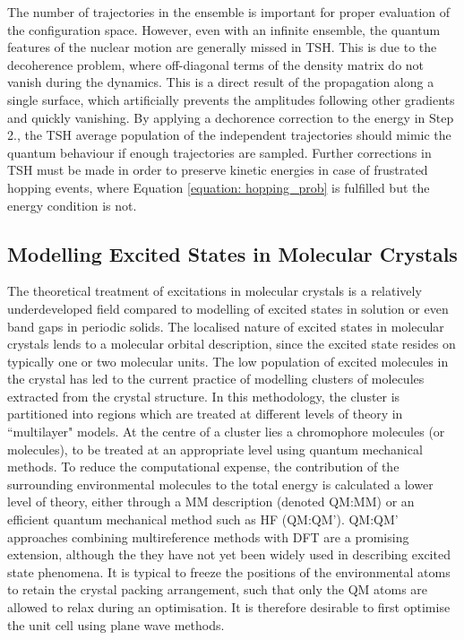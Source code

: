The number of trajectories in the ensemble is important for proper evaluation of the configuration space. However, even with an infinite ensemble, the quantum features of the nuclear motion are generally missed in \ac{TSH}. This is due to the decoherence problem, where off-diagonal terms of the density matrix do not vanish during the dynamics. This is a direct result of the propagation along a single surface, which artificially prevents the amplitudes following other gradients and quickly vanishing.\cite{Crespo-Otero2018} By applying a dechorence correction to the energy in Step 2., the \ac{TSH} average population of the independent trajectories should mimic the quantum behaviour if enough trajectories are sampled.\cite{Granucci2007} Further corrections in \ac{TSH} must be made in order to preserve kinetic energies in case of frustrated hopping events, where Equation \ref{equation: hopping_prob} is fulfilled but the energy condition is not.

\subsection{Modelling Excited States in Molecular Crystals} \label{section: excited_states_crystals}
The theoretical treatment of excitations in molecular crystals is a relatively underdeveloped field compared to modelling of excited states in solution or even band gaps in periodic solids. The localised nature of excited states in molecular crystals lends to a molecular orbital description, since the excited state resides on typically one or two molecular units.\cite{Sauer1989} The low population of excited molecules in the crystal has led to the current practice of modelling clusters of molecules extracted from the crystal structure. In this methodology, the cluster is partitioned into regions which are treated at different levels of theory in ``multilayer" models. At the centre of a cluster lies a chromophore molecules (or molecules), to be treated at an appropriate level using quantum mechanical methods. To reduce the computational expense, the contribution of the surrounding environmental molecules to the total energy is calculated a lower level of theory, either through a \acf{MM} description (denoted QM:MM) or an efficient quantum mechanical method such as \ac{HF} (QM:QM'). QM:QM' approaches combining multireference methods with DFT are a promising extension, although the they have not yet been widely used in describing excited state phenomena.\cite{Libisch2014,Cheng2017,Cheng2017a} It is typical to freeze the positions of the environmental atoms to retain the crystal packing arrangement, such that only the QM atoms are allowed to relax during an optimisation. It is therefore desirable to first optimise the unit cell using plane wave methods.\cite{Presti2016} 

